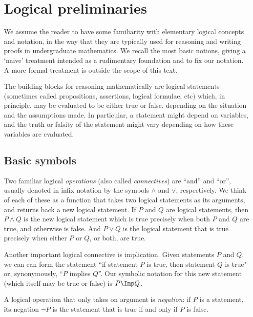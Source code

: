 

\section{Logical preliminaries}
\label{sec:logical-prelim}

We assume the reader to have some familiarity with elementary logical concepts and notation, in the way that they are typically used for reasoning and writing proofs in undergraduate mathematics. We recall the most basic notions, giving a `naive' treatment  intended as a rudimentary foundation and to fix our notation. A more formal treatment is outside the scope of this text. 

The building blocks for reasoning mathematically are logical statements (sometimes called propositions, assertions, logical formulae, etc) which, in principle, may be evaluated to be either true or false, depending on the situation and the assumptions made.  In particular, a statement might depend on variables, and the truth or falsity of the statement might vary depending on how these variables are evaluated. 

\subsection{Basic symbols}

Two familiar logical \emph{operations} (also called \emph{connectives}) are ``and'' and ``or'', usually denoted in infix notation by the symbols $\wedge$ and $\vee$, respectively. We think of each of these as a function that takes two logical statements as its arguments, and returns back a new logical statement. If $P$ and $Q$ are logical statements, then $P \wedge Q$ is the new logical statement which is true precisely when both $P$ and $Q$ are true, and otherwise is false. And $P \vee Q$ is the logical statement that is true precisely when either $P$ or $Q$, or both, are true.

Another important logical connective is implication. Given statements $P$ and $Q$, we can can form the statement ``if statement $P$ is true, then statement $Q$ is true" or, synonymously, ``$P$ implies $Q$''. Our symbolic notation for this new statement (which itself may be true or false) is $P \Imp Q$. 

A logical operation that only takes on argument is \emph{negation}: if $P$ is a statement, its negation $\lnot P$ is the statement that is true if and only if $P$ is false. 

